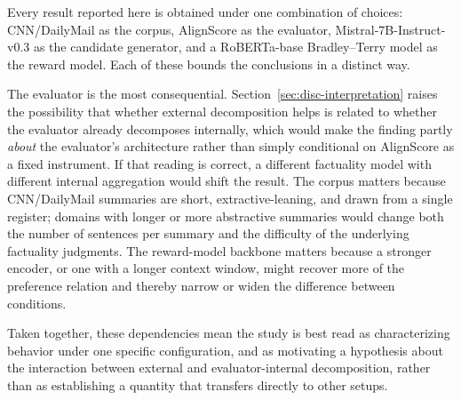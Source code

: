 Every result reported here is obtained under one combination of choices:
CNN/DailyMail as the corpus, AlignScore as the evaluator,
Mistral-7B-Instruct-v0.3 as the candidate generator, and a RoBERTa-base
Bradley--Terry model as the reward model. Each of these bounds the conclusions in
a distinct way.

The evaluator is the most consequential. Section~\ref{sec:disc-interpretation}
raises the possibility that whether external decomposition helps is related to
whether the evaluator already decomposes internally, which would make the finding
partly \emph{about} the evaluator's architecture rather than simply conditional on
AlignScore as a fixed instrument. If that reading is correct, a different
factuality model with different internal aggregation would shift the result. The corpus matters because CNN/DailyMail
summaries are short, extractive-leaning, and drawn from a single register; domains
with longer or more abstractive summaries would change both the number of
sentences per summary and the difficulty of the underlying factuality judgments.
The reward-model backbone matters because a stronger encoder, or one with a longer
context window, might recover more of the preference relation and thereby narrow
or widen the difference between conditions.

Taken together, these dependencies mean the study is best read as characterizing
behavior under one specific configuration, and as motivating a hypothesis about
the interaction between external and evaluator-internal decomposition, rather than
as establishing a quantity that transfers directly to other setups.
